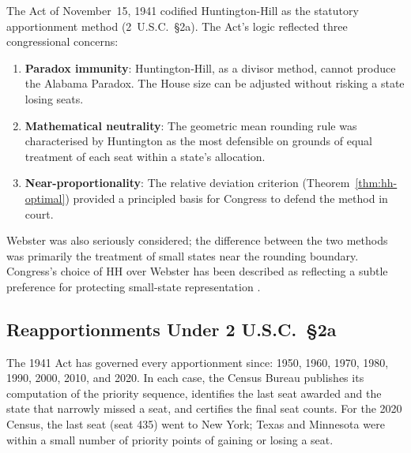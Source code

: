 The Act of November~15, 1941 codified Huntington-Hill as the
statutory apportionment method (2~U.S.C.\ \S2a).
The Act's logic reflected three congressional concerns:
\begin{enumerate}
  \item \textbf{Paradox immunity}: Huntington-Hill, as a divisor method,
    cannot produce the Alabama Paradox.
    The House size can be adjusted without risking a state losing seats.
  \item \textbf{Mathematical neutrality}: The geometric mean rounding rule
    was characterised by Huntington as the most defensible on grounds of
    equal treatment of each seat within a state's allocation.
  \item \textbf{Near-proportionality}: The relative deviation criterion
    (Theorem~\ref{thm:hh-optimal}) provided a principled basis for
    Congress to defend the method in court.
\end{enumerate}
Webster was also seriously considered; the difference between the two
methods was primarily the treatment of small states near the rounding
boundary.
Congress's choice of HH over Webster has been described as reflecting
a subtle preference for protecting small-state representation
\citep{balinski1982fair,schmeckebier1941congressional}.

\subsection{Reapportionments Under 2 U.S.C.\ \S2a}

The 1941 Act has governed every apportionment since:
1950, 1960, 1970, 1980, 1990, 2000, 2010, and 2020.
In each case, the Census Bureau publishes its computation of the
priority sequence, identifies the last seat awarded and the state
that narrowly missed a seat, and certifies the final seat counts.
For the 2020 Census, the last seat (seat 435) went to New York;
Texas and Minnesota were within a small number of priority points
of gaining or losing a seat.
